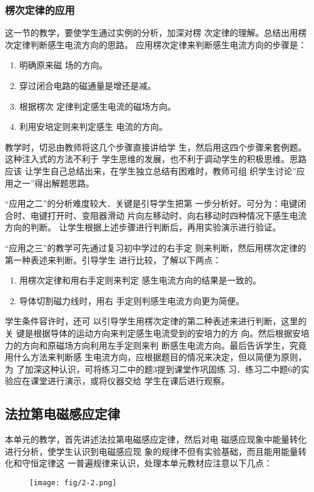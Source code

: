 \subsubsection{楞次定律的应用}
这一节的教学，要使学生通过实例的分析，加深对楞
次定律的理解。总结出用楞次定律判断感生电流方向的思路。
应用楞次定律来判断感生电流方向的步骤是：
\begin{enumerate}
\item 明确原来磁
场的方向。
\item 穿过闭合电路的磁通量是增还是减。
\item 根据楞次
定律判定感生电流的磁场方向。
\item 利用安培定则来判定感生
电流的方向。
\end{enumerate}
教学时，切忌由教师将这几个步骤直接讲给学
生，然后用这四个步骤来套例题。这种注入式的方法不利于
学生思维的发展，也不利于调动学生的积极思维。思路应该
让学生自己总结出来，在学生独立总结有困难时，教师可组
织学生讨论”应用之一”得出解题思路。

“应用之二”的分析难度较大．关键是引导学生把第
一步分析好。可分为：电键闭合时、电键打开时、变阻器滑动
片向左移动时、向右移动时四种情况下感生电流方向的判断。
让学生根据上述步骤进行判断后，再用实验演示进行验证。

“应用之三”的教学可先通过复习初中学过的右手定
则来判断，然后用楞次定律的第一种表述来判断。引导学生
进行比较，了解以下两点：
\begin{enumerate}
 \item 用楞次定律和用右手定则来判定
感生电流方向的结果是一致的。
\item 导体切割磁力线时，用右
手定则判感生电流方向更为简便。   
\end{enumerate}
学生条件容许时，还可
以引导学生用楞次定律的第二种表述来进行判断，这里的关
键是根据导体的运动方向来判定感生电流受到的安培力的方
向。然后根据安培力的方向和原磁场方向利用左手定则来判
断感生电流方向。最后告诉学生，究竟用什么方法来判断感
生电流方向，应根据题目的情况来决定，但以简便为原则，为
了加深这种认识，可将练习二中的题3提到课堂作巩固练
习．练习二中题6的实验应在课堂进行演示，或将仪器交给
学生在课后进行观察。

\subsection{法拉第电磁感应定律}
本单元的教学，首先讲述法拉第电磁感应定律，然后对电
磁感应现象中能量转化进行分析，使学生认识到电磁感应现
象的规律不但有实验基础，而且能用能量转化和守恒定律这
一普遍规律来认识，处理本单元教材应注意以下几点：
\begin{figure}[htp]
    \centering
\texttt{[image: fig/2-2.png]}
    \caption{}
\end{figure}


